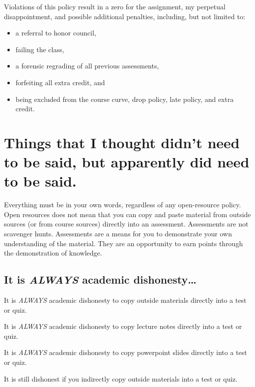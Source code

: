 \documentclass[
]{book}
\providecommand{\tightlist}{%
  \setlength{\itemsep}{0pt}\setlength{\parskip}{0pt}}
\begin{document}
Violations of this policy result in a zero for the assignment, my perpetual disappointment, and possible additional penalties, including, but not limited to:

\begin{itemize}
\tightlist
\item
  a referral to honor council,
\item
  failing the class,
\item
  a forensic regrading of all previous assessments,
\item
  forfeiting all extra credit, and
\item
  being excluded from the course curve, drop policy, late policy, and extra credit.
\end{itemize}

\hypertarget{things-that-i-thought-didnt-need-to-be-said-but-apparently-did-need-to-be-said.}{%
\section{Things that I thought didn't need to be said, but apparently did need to be said.}\label{things-that-i-thought-didnt-need-to-be-said-but-apparently-did-need-to-be-said.}}

Everything must be in your own words, regardless of any open-resource policy.
Open resources does not mean that you can copy and paste material from outside sources (or from course sources) directly into an assessment.
Assessments are not scavenger hunts.
Assessments are a means for you to demonstrate your own understanding of the material.
They are an opportunity to earn points through the demonstration of knowledge.

\hypertarget{it-is-always-academic-dishonesty}{%
\subsection{\texorpdfstring{It is \emph{ALWAYS} academic dishonesty\ldots{}}{It is ALWAYS academic dishonesty\ldots{}}}\label{it-is-always-academic-dishonesty}}

It is \emph{ALWAYS} academic dishonesty to copy outside materials directly into a test or quiz.

It is \emph{ALWAYS} academic dishonesty to copy lecture notes directly into a test or quiz.

It is \emph{ALWAYS} academic dishonesty to copy powerpoint slides directly into a test or quiz.

It is still dishonest if you indirectly copy outside materials into a test or quiz.
\end{document}
